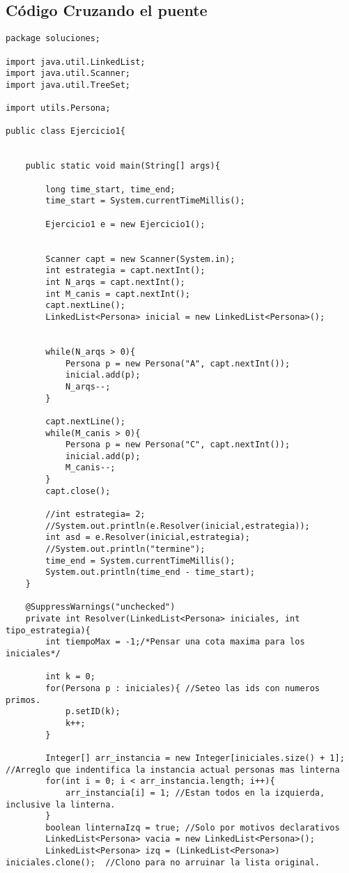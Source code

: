 \subsection{C\'odigo Cruzando el puente}
	\begin{lstlisting}
package soluciones;

import java.util.LinkedList;
import java.util.Scanner;
import java.util.TreeSet;

import utils.Persona;

public class Ejercicio1{


	public static void main(String[] args){
		
		long time_start, time_end;
		time_start = System.currentTimeMillis();
		
		Ejercicio1 e = new Ejercicio1();
        
        
		Scanner capt = new Scanner(System.in);
        int estrategia = capt.nextInt();
        int N_arqs = capt.nextInt();
        int M_canis = capt.nextInt();
        capt.nextLine();
        LinkedList<Persona> inicial = new LinkedList<Persona>();
       
        
        while(N_arqs > 0){
        	Persona p = new Persona("A", capt.nextInt());
        	inicial.add(p);
        	N_arqs--;
        }

        capt.nextLine();
        while(M_canis > 0){
        	Persona p = new Persona("C", capt.nextInt());
        	inicial.add(p);
        	M_canis--;
        }
        capt.close();

        //int estrategia= 2;
        //System.out.println(e.Resolver(inicial,estrategia));
        int asd = e.Resolver(inicial,estrategia);
        //System.out.println("termine");
		time_end = System.currentTimeMillis();
		System.out.println(time_end - time_start);
	}
	
	@SuppressWarnings("unchecked")
	private int Resolver(LinkedList<Persona> iniciales, int tipo_estrategia){
		int tiempoMax = -1;/*Pensar una cota maxima para los iniciales*/

		int k = 0;
		for(Persona p : iniciales){	//Seteo las ids con numeros primos.
			p.setID(k);
			k++;					
		}
		
		Integer[] arr_instancia = new Integer[iniciales.size() + 1]; //Arreglo que indentifica la instancia actual personas mas linterna
		for(int i = 0; i < arr_instancia.length; i++){
			arr_instancia[i] = 1; //Estan todos en la izquierda, inclusive la linterna.
		}
		boolean linternaIzq = true;	//Solo por motivos declarativos
		LinkedList<Persona> vacia = new LinkedList<Persona>();
		LinkedList<Persona> izq = (LinkedList<Persona>) iniciales.clone();	//Clono para no arruinar la lista original.
		

\end{lstlisting}

